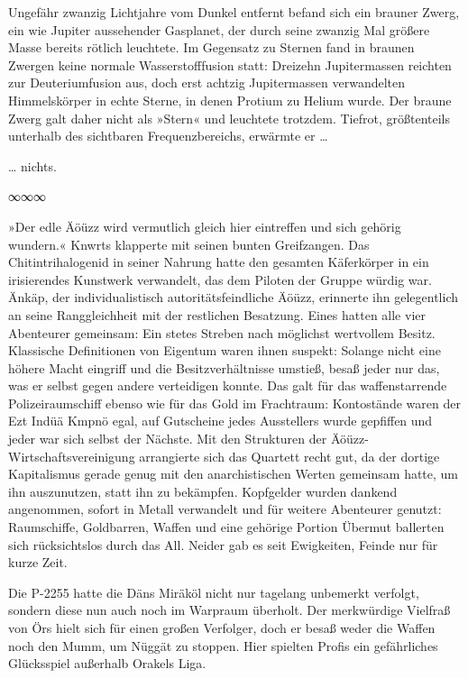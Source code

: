 Ungefähr zwanzig Lichtjahre vom Dunkel entfernt befand sich ein brauner Zwerg, ein wie Jupiter aussehender Gasplanet, der durch seine zwanzig Mal größere Masse bereits rötlich leuchtete. Im Gegensatz zu Sternen fand in braunen Zwergen keine normale Wasserstofffusion statt: Dreizehn Jupitermassen reichten zur Deuteriumfusion aus, doch erst achtzig Jupitermassen verwandelten Himmelskörper in echte Sterne, in denen Protium zu Helium wurde. Der braune Zwerg galt daher nicht als »Stern« und leuchtete trotzdem. Tiefrot, größtenteils unterhalb des sichtbaren Frequenzbereichs, erwärmte er …

\bigskip

… nichts.

\begin{center}
∞∞∞
\end{center}

»Der edle Äöüzz wird vermutlich gleich hier eintreffen und sich gehörig wundern.« Knwrts klapperte mit seinen bunten Greifzangen. Das Chitintrihalogenid in seiner Nahrung hatte den gesamten Käferkörper in ein irisierendes Kunstwerk verwandelt, das dem Piloten der Gruppe würdig war. Änkäp, der individualistisch autoritätsfeindliche Äöüzz, erinnerte ihn gelegentlich an seine Ranggleichheit mit der restlichen Besatzung. Eines hatten alle vier Abenteurer gemeinsam: Ein stetes Streben nach möglichst wertvollem Besitz. Klassische Definitionen von Eigentum waren ihnen suspekt: Solange nicht eine höhere Macht eingriff und die Besitzverhältnisse umstieß, besaß jeder nur das, was er selbst gegen andere verteidigen konnte. Das galt für das waffenstarrende Polizeiraumschiff ebenso wie für das Gold im Frachtraum: Kontostände waren der Ezt Indüä Kmpnö egal, auf Gutscheine jedes Ausstellers wurde gepfiffen und jeder war sich selbst der Nächste. Mit den Strukturen der Äöüzz-Wirtschaftsvereinigung arrangierte sich das Quartett recht gut, da der dortige Kapitalismus gerade genug mit den anarchistischen Werten gemeinsam hatte, um ihn auszunutzen, statt ihn zu bekämpfen. Kopfgelder wurden dankend angenommen, sofort in Metall verwandelt und für weitere Abenteurer genutzt: Raumschiffe, Goldbarren, Waffen und eine gehörige Portion Übermut ballerten sich rücksichtslos durch das All. Neider gab es seit Ewigkeiten, Feinde nur für kurze Zeit.

Die P-2255 hatte die Däns Miräköl nicht nur tagelang unbemerkt verfolgt, sondern diese nun auch noch im Warpraum überholt. Der merkwürdige Vielfraß von Örs hielt sich für einen großen Verfolger, doch er besaß weder die Waffen noch den Mumm, um Nüggät zu stoppen. Hier spielten Profis ein gefährliches Glücksspiel außerhalb Orakels Liga.

